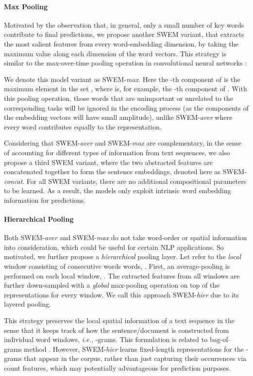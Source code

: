 \documentclass[11pt,a4paper]{article}
\begin{document}
\paragraph{Max Pooling}
Motivated by the observation that, in general, only a small number of key words contribute to final predictions, we propose another SWEM variant, that extracts the most salient features from every word-embedding dimension, by taking the maximum value along each dimension of the word vectors.
This strategy is similar to the max-over-time pooling operation in convolutional neural networks \citep{collobert2011natural}:

We denote this model variant as SWEM-\emph{max}.
Here the -th component of  is the maximum element in the set , where  is, for example, the -th component of . With this pooling operation, those words that are unimportant or unrelated to the corresponding tasks will be ignored in the encoding process (as the components of the embedding vectors will have small amplitude), unlike SWEM-\emph{aver} where every word contributes equally to the representation.

Considering that SWEM-\emph{aver} and SWEM-\emph{max} are complementary, in the sense of accounting for different types of information from text sequences, we also propose a third SWEM variant, where the two abstracted features are concatenated together to form the sentence embeddings, denoted here as SWEM-\emph{concat}.
For all SWEM variants, there are no additional compositional parameters to be learned.
As a result, the models only exploit intrinsic word embedding information for predictions.

\paragraph{Hierarchical Pooling}\label{swem_lg}
Both SWEM-\emph{aver} and SWEM-\emph{max} do not take word-order or spatial information into consideration, which could be useful for certain NLP applications.
So motivated, we further propose a \emph{hierarchical} pooling layer.
Let  refer to the \emph{local} window consisting of  consecutive words words, .
First, an average-pooling is performed on each local window, .
The extracted features from all windows are further down-sampled with a \emph{global} max-pooling operation on top of the representations for every window.
We call this approach SWEM-\emph{hier} due to its layered pooling.

This strategy preserves the local spatial information of a text sequence in the sense that it keeps track of how the sentence/document is constructed from individual word windows, \emph{i.e.}, -grams.
This formulation is related to bag-of--grams method \cite{zhang2015character}. 
However, SWEM-\emph{hier} learns fixed-length representations for the -grams that appear in the corpus, rather than just capturing their occurrences via count features, which may potentially advantageous for prediction purposes.
\end{document}
